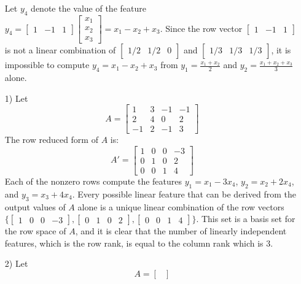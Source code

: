 \documentclass{article}
\begin{document}
\begin{itemize}
Let \(y_4\) denote the value of the feature \(y_4 = \begin{bmatrix} 1 & -1 & 1 \end{bmatrix}\begin{bmatrix} x_1 \\ x_2 \\ x_3 \end{bmatrix} = x_1 - x_2 + x_3\). Since the row vector \(\begin{bmatrix} 1 & -1 & 1 \end{bmatrix}\) is not a linear combination of \(\begin{bmatrix} 1/2 & 1/2 & 0 \end{bmatrix}\) and \(\begin{bmatrix} 1/3 & 1/3 & 1/3 \end{bmatrix}\), it is impossible to compute \(y_4 = x_1 - x_2 + x_3\) from \(y_1 = \frac{x_1 + x_2}{2}\) and \(y_2 = \frac{x_1 + x_2 + x_3}{3}\) alone.    
\item[1)] Let \[A = \begin{bmatrix}
  1 & 3 &  -1 &  -1 \\
  2 & 4 &   0 &   2 \\
-1 &  2 & -1 &   3 
\end{bmatrix}\]
The row reduced form of \(A\) is:
\[A' = \begin{bmatrix}
1 & 0 & 0 & -3 \\
0 & 1 & 0 &  2 \\
0 & 0 & 1 &  4 
\end{bmatrix}\]
Each of the nonzero rows compute the features \(y_1 = x_1 - 3x_4\), \(y_2 = x_2 + 2x_4\), and \(y_3 = x_3 + 4x_4\). Every possible linear feature that can be derived from the output values of \(A\) alone is a unique linear combination of the row vectors \(\{\begin{bmatrix} 1 & 0 & 0 & -3 \end{bmatrix}, \begin{bmatrix} 0 & 1 & 0 & 2 \end{bmatrix}, \begin{bmatrix} 0 & 0 & 1 & 4 \end{bmatrix}\}\). This set is a basis set for the row space of \(A\), and it is clear that the number of linearly independent features, which is the row rank, is equal to the column rank which is \(3\).
\item[2)] Let \[A = \begin{bmatrix}

\end{bmatrix}\]
\end{itemize}
\end{document}

